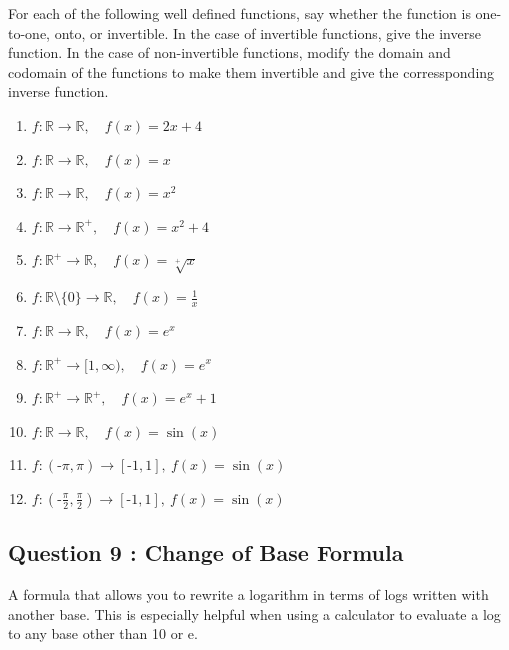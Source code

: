 \documentclass[]{article}
\begin{document}
		\newpage
		For each of the following well defined functions, say whether the function is one-to-one, onto, or invertible. In the case of invertible functions, give the inverse function. In the case of non-invertible functions, modify the domain and codomain of the functions to make them invertible and give the corressponding inverse function.
		\begin{multicols}{2}
			\begin{enumerate}
				\item $f: \mathbb{R} \to \mathbb{R},\quad f(x)=2x+4$
				\item $f: \mathbb{R} \to \mathbb{R},\quad f(x)=x$
				\item $f: \mathbb{R} \to \mathbb{R},\quad f(x)=x^2$
				\item $f: \mathbb{R} \to \mathbb{R}^+,\quad f(x)=x^2+4$
				\item $f: \mathbb{R}^+ \to \mathbb{R},\quad f(x)=\sqrt[+]{x}$
				\item $f: \mathbb{R}\setminus\{0\} \to \mathbb{R},\quad f(x)=\frac{1}{x}$
				\item $f: \mathbb{R} \to \mathbb{R},\quad f(x)=e^x$
				\item $f: \mathbb{R}^+ \to [1,\infty),\quad f(x)=e^x$
				\item $f: \mathbb{R}^+ \to \mathbb{R}^+,\quad f(x)=e^x+1$
				\item $f: \mathbb{R} \to \mathbb{R},\quad f(x)=\sin(x)$
				\item $f: (\text{-}\pi,\pi) \to [\text{-}1,1],\  f(x)=\sin(x)$
				\item $f: (\text{-}\frac{\pi}{2},\frac{\pi}{2}) \to [\text{-}1,1],\  f(x)=\sin(x)$
			\end{enumerate}
		\end{multicols}


\bigskip

	\subsection*{Question 9 : Change of Base Formula}
	A formula that allows you to rewrite a logarithm in terms of logs written with another base. This is especially helpful when using a calculator to evaluate a log to any base other than 10 or e.
	
\end{document}
